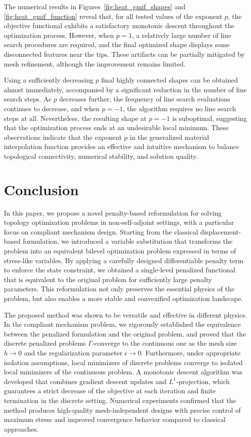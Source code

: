 \documentclass{amsart}
\begin{document}
The numerical results in Figures~\ref{fig:heat_gmif_shapes} and \ref{fig:heat_gmif_function} reveal that, for all tested values of the exponent $p$, the objective functional exhibits a satisfactory monotonic descent throughout the optimization process. However, when $p=1$, a relatively large number of line search procedures are required, and the final optimized shape displays some disconnected features near the tips. These artifacts can be partially mitigated by mesh refinement, although the improvement remains limited. 

Using a sufficiently decreasing $p$ final highly connected shapes can be obtained almost immediately, accompanied by a significant reduction in the number of line search steps. As $p$ decreases further, the frequency of line search evaluations continues to decrease, and when $p=-1$, the algorithm requires no line search steps at all. Nevertheless, the resulting shape at $p=-1$ is suboptimal, suggesting that the optimization process ends at an undesirable local minimum. These observations indicate that the exponent $p$ in the generalized material interpolation function provides an effective and intuitive mechanism to balance topological connectivity, numerical stability, and solution quality.

\section{Conclusion}\label{sec:conclusion}
In this paper, we propose a novel penalty-based reformulation for solving topology optimization problems in non-self-adjoint settings, with a particular focus on compliant mechanism design. Starting from the classical displacement-based formulation, we introduced a variable substitution that transforms the problem into an equivalent bilevel optimization problem expressed in terms of stress-like variables. By applying a carefully designed differentiable penalty term to enforce the state constraint, we obtained a single-level penalized functional that is equivalent to the original problem for sufficiently large penalty parameters. This reformulation not only preserves the essential physics of the problem, but also enables a more stable and convexified optimization landscape.

The proposed method was shown to be versatile and effective in different physics. In the compliant mechanism problem, we rigorously established the equivalence between the penalized formulation and the original problem, and proved that the discrete penalized problems $\Gamma$-converge to the continuous one as the mesh size $h \to 0$ and the regularization parameter $\epsilon \to 0$. Furthermore, under appropriate isolation assumptions, local minimizers of discrete problems converge to isolated local minimizers of the continuous problem. A monotonic descent algorithm was developed that combines gradient descent updates and $L^1$-projection, which guarantees a strict decrease of the objective at each iteration and finite termination in the discrete setting. Numerical experiments confirmed that the method produces high-quality mesh-independent designs with precise control of maximum stress and improved convergence behavior compared to classical approaches.
\end{document}
